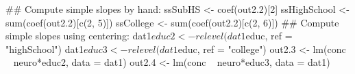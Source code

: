 \begin{Schunk}
\begin{Sinput}
 ## Compute simple slopes by hand:
 ssSubHS <- coef(out2.2)[2]
 ssHighSchool <- sum(coef(out2.2)[c(2, 5)])
 ssCollege <- sum(coef(out2.2)[c(2, 6)])
 ## Compute simple slopes using centering:
 dat1$educ2 <- relevel(dat1$educ, ref = "highSchool")
 dat1$educ3 <- relevel(dat1$educ, ref = "college")
 out2.3 <- lm(conc ~ neuro*educ2, data = dat1)
 out2.4 <- lm(conc ~ neuro*educ3, data = dat1)
\end{Sinput}
\end{Schunk}
